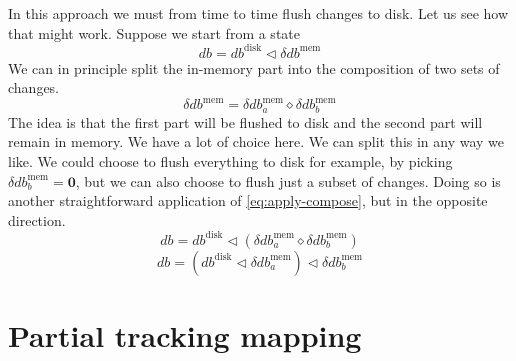 \documentclass[11pt,a4paper]{article}
\begin{document}
In this approach we must from time to time flush changes to disk. Let us see
how that might work. Suppose we start from a state
\[
\mathit{db} = \mathit{db}^{\mathrm{disk}}
      \triangleleft \delta\mathit{db}^{\mathrm{mem}}
\]
We can in principle split the in-memory part into the composition of two sets
of changes.
\[
\delta\mathit{db}^{\mathrm{mem}} = \delta\mathit{db}^{\mathrm{mem}}_a \diamond \delta\mathit{db}^{\mathrm{mem}}_b
\]
The idea is that the first part will be flushed to disk and the second part
will remain in memory. We have a lot of choice here. We can split this in any
way we like. We could choose to flush everything to disk for example, by picking
$\delta\mathit{db}^{\mathrm{mem}}_b = \mathbf{0}$, but we can also choose to
flush just a subset of changes. Doing so is another straightforward application
of \cref{eq:apply-compose}, but in the opposite direction.
\[
\mathit{db} = \mathit{db}^{\mathrm{disk}}
      \triangleleft \left( \delta\mathit{db}^{\mathrm{mem}}_a \diamond \delta\mathit{db}^{\mathrm{mem}}_b \right)
\]
\[
\mathit{db} = \left(\mathit{db}^{\mathrm{disk}}
      \triangleleft \delta\mathit{db}^{\mathrm{mem}}_a \right) \triangleleft \delta\mathit{db}^{\mathrm{mem}}_b
\]


\section{Partial tracking mapping}




\end{document}
